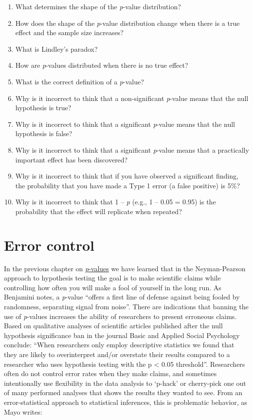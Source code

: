 \documentclass[
  oneside]{krantz}
\begin{document}
\begin{enumerate}
\def\labelenumi{\arabic{enumi}.}
\item
  What determines the shape of the \emph{p}-value distribution?
\item
  How does the shape of the \emph{p}-value distribution change when there is a true effect and the sample size increases?
\item
  What is Lindley's paradox?
\item
  How are \emph{p}-values distributed when there is no true effect?
\item
  What is the correct definition of a \emph{p}-value?
\item
  Why is it incorrect to think that a non-significant \emph{p}-value means that the null hypothesis is true?
\item
  Why is it incorrect to think that a significant \emph{p}-value means that the null hypothesis is false?
\item
  Why is it incorrect to think that a significant \emph{p}-value means that a practically important effect has been discovered?
\item
  Why is it incorrect to think that if you have observed a significant finding, the probability that you have made a Type 1 error (a false positive) is 5\%?
\item
  Why is it incorrect to think that 1 -- \emph{p} (e.g., 1 -- 0.05 = 0.95) is the probability that the effect will replicate when repeated?
\end{enumerate}

\hypertarget{errorcontrol}{%
\chapter{Error control}\label{errorcontrol}}

In the previous chapter on \protect\hyperlink{pvalue}{\emph{p}-values} we have learned that in the Neyman-Pearson approach to hypothesis testing the goal is to make scientific claims while controlling how often you will make a fool of yourself in the long run. As Benjamini \citeyearpar{benjamini_its_2016} notes, a \emph{p}-value ``offers a first line of defense against being fooled by randomness, separating signal from noise''. There are indications that banning the use of \emph{p}-values increases the ability of researchers to present erroneous claims. Based on qualitative analyses of scientific articles published after the null hypothesis significance ban in the journal Basic and Applied Social Psychology \citet{fricker_assessing_2019} conclude: ``When researchers only employ descriptive statistics we found that they are likely to overinterpret and/or overstate their results compared to a researcher who uses hypothesis testing with the p \textless{} 0.05 threshold''. Researchers often do not control error rates when they make claims, and sometimes intentionally use flexibility in the data analysis to `p-hack' or cherry-pick one out of many performed analyses that shows the results they wanted to see. From an error-statistical approach to statistical inferences, this is problematic behavior, as Mayo \citeyearpar{mayo_statistical_2018} writes:
\end{document}
